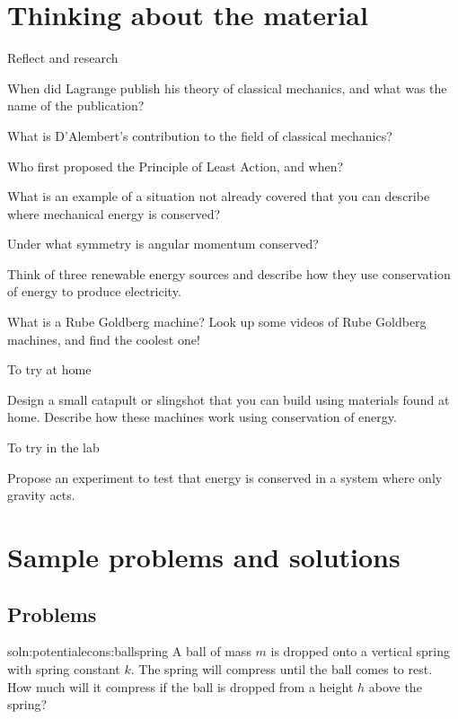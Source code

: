 \section{Thinking about the material}
\begin{chapteractivity}{Reflect and research}
{
\item When did Lagrange publish his theory of classical mechanics, and what was the name of the publication?
\item What is D'Alembert's contribution to the field of classical mechanics?
\item Who first proposed the Principle of Least Action, and when?
\item What is an example of a situation not already covered that you can describe where mechanical energy is conserved?
\item Under what symmetry is angular momentum conserved?
\item Think of three renewable energy sources and describe how they use conservation of energy to produce electricity. 
\item What is a Rube Goldberg machine? Look up some videos of Rube Goldberg machines, and find the coolest one!
}
\end{chapteractivity}

\begin{chapteractivity}{To try at home}
{
\item Design a small catapult or slingshot that you can build using materials found at home. Describe how these machines work using conservation of energy.
}
\end{chapteractivity}

\begin{chapteractivity}{To try in the lab}
{
\item Propose an experiment to test that energy is conserved in a system where only gravity acts.
}
\end{chapteractivity}
\newpage
\section{Sample problems and solutions}
\subsection{Problems}
\begin{problem}{soln:potentialecons:ballspring}{\label{prob:potentialecons:ballspring} A ball of mass $m$ is dropped onto a vertical spring with spring constant $k$. The spring will compress until the ball comes to rest. How much will it compress if the ball is dropped from a height $h$ above the spring?}
\end{problem}


